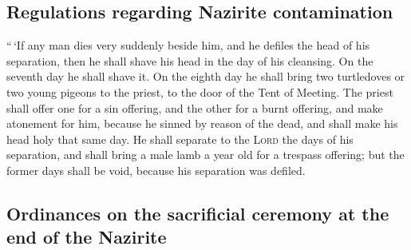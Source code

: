 \hypertarget{regulations-regarding-nazirite-contamination}{%
\subsection{Regulations regarding Nazirite
contamination}\label{regulations-regarding-nazirite-contamination}}

 ``\,`If any man dies very suddenly beside him, and he
defiles the head of his separation, then he shall shave his head in the
day of his cleansing. On the seventh day he shall shave it.
 On the eighth day he shall bring two turtledoves or two
young pigeons to the priest, to the door of the Tent of Meeting.
 The priest shall offer one for a sin offering, and the
other for a burnt offering, and make atonement for him, because he
sinned by reason of the dead, and shall make his head holy that same
day.  He shall separate to the \textsc{Lord} the days of
his separation, and shall bring a male lamb a year old for a trespass
offering; but the former days shall be void, because his separation was
defiled.

\hypertarget{ordinances-on-the-sacrificial-ceremony-at-the-end-of-the-nazirite}{%
\subsection{Ordinances on the sacrificial ceremony at the end of the
Nazirite}\label{ordinances-on-the-sacrificial-ceremony-at-the-end-of-the-nazirite}}

